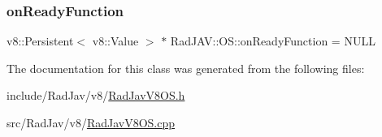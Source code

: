 \subsubsection{\texorpdfstring{on\+Ready\+Function}{onReadyFunction}}
{\footnotesize\ttfamily v8\+::\+Persistent$<$ v8\+::\+Value $>$ $\ast$ Rad\+J\+A\+V\+::\+O\+S\+::on\+Ready\+Function = N\+U\+LL\hspace{0.3cm}{\ttfamily [static]}}



The documentation for this class was generated from the following files\+:\begin{DoxyCompactItemize}
\item 
include/\+Rad\+Jav/v8/\mbox{\hyperlink{_rad_jav_v8_o_s_8h}{Rad\+Jav\+V8\+O\+S.\+h}}\item 
src/\+Rad\+Jav/v8/\mbox{\hyperlink{_rad_jav_v8_o_s_8cpp}{Rad\+Jav\+V8\+O\+S.\+cpp}}\end{DoxyCompactItemize}
